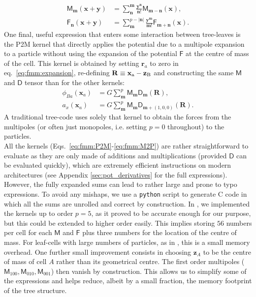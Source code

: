\begin{align}
  \mathsf{M}_{\mathbf{m}}(\mathbf{x} + \mathbf{y}) &=
  \sum_{\mathbf{n}}^{\mathbf{m}}
  \frac{\mathbf{y}^\mathbf{n}}{\mathbf{n}!}\mathsf{M}_{\mathbf{m} -
    \mathbf{n}}(\mathbf{x}), \label{eq:fmm:M2M} \\
  \mathsf{F}_{\mathbf{n}}(\mathbf{x} + \mathbf{y}) &=
  \sum_{\mathbf{m}}^{p-|\mathbf{n}|}
  \frac{\mathbf{y}^\mathbf{m}}{\mathbf{m}!}\mathsf{F}_{\mathbf{m} +
    \mathbf{n}}(\mathbf{x}). \label{eq:fmm:L2L} 
\end{align}
One final, useful expression that enters some interaction between
tree-leaves is the P2M kernel that directly applies the potential due
to a multipole expansion to a particle without using the expansion of
the potential $\mathsf{F}$ at the centre of mass of the cell. This
kernel is obtained by setting $\mathbf{r}_a$ to zero in
eq.~\ref{eq:fmm:expansion}, re-defining
$\mathbf{R}\equiv\mathbf{x}_{\rm a} - \mathbf{z}_{\rm B}$ and
constructing the same $\mathsf{M}$ and $\mathsf{D}$ tensor than for
the other kernels:
\begin{align}
  \phi_{Ba}(\mathbf{x}_a) &= G\sum_{\mathbf{m}}^p \mathsf{M}_{\mathbf{m}} \mathsf{D}_{\mathbf{m}}(\mathbf{R}),\\
  a_x(\mathbf{x}_a) &= G\sum_{\mathbf{m}}^p \mathsf{M}_{\mathbf{m}} \mathsf{D}_{\mathbf{m}+\left(1,0,0\right)}(\mathbf{R}).
  \label{eq:fmm:M2P}
\end{align}
A traditional tree-code uses solely that kernel to obtain the forces
from the multipoles (or often just monopoles, i.e. setting $p=0$ throughout)
to the particles.\\
All the kernels (Eqs.~\ref{eq:fmm:P2M}-\ref{eq:fmm:M2P}) are rather
straightforward to evaluate as they are only made of additions and
multiplications (provided $\mathsf{D}$ can be evaluated quickly),
which are extremely efficient instructions on modern architectures
(see Appendix \ref{sec:pot_derivatives} for the full
expressions). However, the fully expanded sums can lead to rather
large and prone to typo expressions. To avoid any mishaps, we use a
\texttt{python} script to generate C code in which all the sums are
unrolled and correct by construction. In \swift, we implemented the
kernels up to order $p=5$, as it proved to be accurate enough for our
purpose, but this could be extended to higher order easily. This
implies storing $56$ numbers per cell for each $\textsf{M}$ and
$\textsf{F}$ plus three numbers for the location of the centre of
mass. For leaf-cells with large numbers of particles, as in \swift,
this is a small memory overhead. One further small improvement
consists in choosing $\mathbf{z}_A$ to be the centre of mass of cell
$A$ rather than its geometrical centre. The first order multipoles
($\mathsf{M}_{100},\mathsf{M}_{010},\mathsf{M}_{001}$) then vanish by
construction. This allows us to simplify some of the expressions and
helps reduce, albeit by a small fraction, the memory footprint of the
tree structure.

